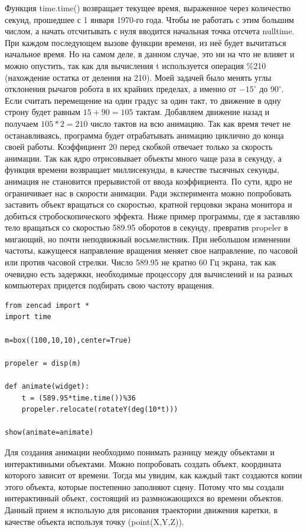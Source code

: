 Функция time.time() возвращает текущее время, выраженное через количество секунд, прошедшее с 1 января 1970-го года. Чтобы не работать с этим большим числом, а начать отсчитывать с нуля вводится начальная точка отсчета nulltime. При каждом последующем вызове функции времени, из неё будет вычитаться начальное время. Но на самом деле, в данном случае, это ни на что не влияет и можно опустить, так как для вычисления t используется операция \%210 (нахождение остатка от деления на 210). Моей задачей было менять углы отклонения рычагов робота в их крайних пределах, а именно от $-15^{\circ}$ до $90^{\circ}$. Если считать перемещение на один градус за один такт, то движение в одну строну будет равным $15+90=105$ тактам. Добавляем движение назад и получаем $105*2=210$ число тактов на всю анимацию. Так как время течет не останавливаясь, программа будет отрабатывать анимацию циклично до конца своей работы. Коэффициент 20 перед скобкой отвечает только за скорость анимации. Так как ядро отрисовывает объекты много чаще раза в секунду, а функция времени возвращает миллисекунды, в качестве тысячных секунды, анимация не становится прерывистой от ввода коэффициента. По сути, ядро не ограничивает нас в скорости анимации. Ради эксперимента можно попробовать заставить объект вращаться со скоростью, кратной герцовки экрана монитора и добиться стробоскопического эффекта. Ниже пример программы, где я заставляю тело вращаться со скоростью 589.95 оборотов в секунду, превратив propeler в мигающий, но почти неподвижный восьмелистник. При небольшом изменении частоты, кажущееся направление вращения меняет свое направление, по часовой или против часовой стрелки. Число 589.95 не кратно 60 Гц экрана, так как очевидно есть задержки, необходимые процессору для вычислений и на разных компьютерах придется подбирать свою частоту вращения. 
\begin{lstlisting}[style=python,caption=Стробоскопический эффект на экране монитора]
from zencad import * 
import time 
 
m=box((100,10,10),center=True) 
 
propeler = disp(m) 
 
def animate(widget): 
    t = (589.95*time.time())%36 
    propeler.relocate(rotateY(deg(10*t))) 
   
show(animate=animate)
\end{lstlisting}

Для создания анимации необходимо понимать разницу между объектами и интерактивными объектами. Можно попробовать создать объект, координата которого зависит от времени. Тогда мы увидим, как каждый такт создаются копии этого объекта, которые постепенно заполняют сцену. Потому что мы создали интерактивный объект, состоящий из размножающихся во времени объектов. Данный прием я использую для рисования траектории движения каретки, в качестве объекта используя точку (point(X,Y,Z)). 

